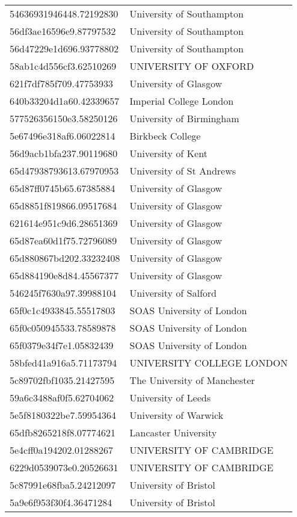 \begin{tabular}{ll}
54636931946448.72192830 & University of Southampton \\
56df3ae16596e9.87797532 & University of Southampton \\
56d47229e1d696.93778802 & University of Southampton \\
58ab1c4d556cf3.62510269 & UNIVERSITY OF OXFORD \\
621f7df785f709.47753933 & University of Glasgow \\
640b33204d1a60.42339657 & Imperial College London \\
577526356150e3.58250126 & University of Birmingham \\
5e67496e318af6.06022814 & Birkbeck College \\
56d9acb1bfa237.90119680 & University of Kent \\
65d47938793613.67970953 & University of St Andrews \\
65d87ff0745b65.67385884 & University of Glasgow \\
65d8851f819866.09517684 & University of Glasgow \\
621614e951c9d6.28651369 & University of Glasgow \\
65d87ea60d1f75.72796089 & University of Glasgow \\
65d880867bd202.33232408 & University of Glasgow \\
65d884190e8d84.45567377 & University of Glasgow \\
546245f7630a97.39988104 & University of Salford \\
65f0c1c4933845.55517803 & SOAS University of London \\
65f0c050945533.78589878 & SOAS University of London \\
65f0379e34f7e1.05832439 & SOAS University of London \\
58bfed41a916a5.71173794 & UNIVERSITY COLLEGE LONDON \\
5c89702fbf1035.21427595 & The University of Manchester \\
59a6c3488af0f5.62704062 & University of Leeds \\
5e5f8180322be7.59954364 & University of Warwick \\
65dfb8265218f8.07774621 & Lancaster University \\
5e4cff0a194202.01288267 & UNIVERSITY OF CAMBRIDGE \\
6229d0539073e0.20526631 & UNIVERSITY OF CAMBRIDGE \\
5c87991e68fba5.24212097 & University of Bristol \\
5a9e6f953f30f4.36471284 & University of Bristol \\

\end{tabular}

